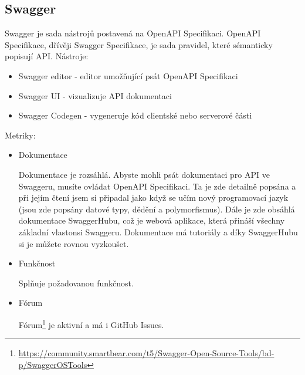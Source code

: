 \documentclass[thesis=B,czech]{FITthesis}[2012/06/26]
\begin{document}
        \subsection{Swagger}
            Swagger \cite{swagger} je sada nástrojů postavená na OpenAPI Specifikaci. OpenAPI Specifikace, dřívěji Swagger Specifikace, je sada pravidel, které sémanticky popisují API. Nástroje:
            \begin{itemize}
                \item Swagger editor - editor umožňující psát OpenAPI Specifikaci
                \item Swagger UI - vizualizuje API dokumentaci
                \item Swagger Codegen - vygeneruje kód clientské nebo serverové části
            \end{itemize}
            Metriky:
            \begin{itemize}
                \item Dokumentace
                
                    Dokumentace je rozsáhlá. Abyste mohli psát dokumentaci pro API ve Swaggeru, musíte ovládat OpenAPI Specifikaci. Ta je zde detailně popsána a při jejím čtení jsem si připadal jako když se učím nový programovací jazyk (jsou zde popsány datové typy, dědění a polymorfismus). Dále je zde obsáhlá dokumentace SwaggerHubu, což je webová aplikace, která přináší všechny základní vlastonsi Swaggeru. Dokumentace má tutoriály a díky SwaggerHubu si je můžete rovnou vyzkoušet.
                \item Funkčnost
                
                    Splňuje požadovanou funkčnost.
                \item Fórum
                
                    Fórum\footnote{\url{https://community.smartbear.com/t5/Swagger-Open-Source-Tools/bd-p/SwaggerOSTools}} je aktivní a má i GitHub Issues.
            \end{itemize}
\end{document}
